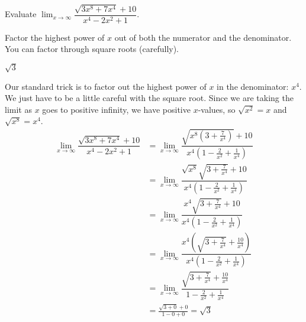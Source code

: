 \begin{Mquestion}
Evaluate $\displaystyle\lim_{x \rightarrow\infty} \dfrac{\sqrt{3x^8+7x^4}+10}{x^4-2x^2+1}$.
\end{Mquestion}
\begin{hint} Factor the highest power of $x$ out of both the numerator
        and the denominator. You can factor through square roots (carefully).
 \end{hint}
\begin{answer} $\sqrt{3}$
\end{answer}
\begin{solution}
Our standard trick is to factor out the highest power of $x$ in the denominator: $x^4$. We just have to be a little careful with the square root. Since we are taking the limit as $x$ goes to positive infinity, we have positive $x$-values, so $\sqrt{x^2}=x$ and $\sqrt{x^8}=x^4$.
\begin{align*}
\displaystyle\lim_{x \rightarrow\infty} \dfrac{\sqrt{3x^8+7x^4}+10}{x^4-2x^2+1}&=
\displaystyle\lim_{x \rightarrow\infty} \dfrac{\sqrt{x^8(3+\frac{7}{x^4})}+10}{x^4(1-\frac{2}{x^2}+\frac{1}{x^4})}
\\&=
\displaystyle\lim_{x \rightarrow\infty} \dfrac{\sqrt{x^8}\sqrt{3+\frac{7}{x^4}}+10}{x^4(1-\frac{2}{x^2}+\frac{1}{x^4})}\\&=
\displaystyle\lim_{x \rightarrow\infty} \dfrac{x^4\sqrt{3+\frac{7}{x^4}}+10}{x^4(1-\frac{2}{x^2}+\frac{1}{x^4})}\\&=
\displaystyle\lim_{x \rightarrow\infty} \dfrac{x^4\left(\sqrt{3+\frac{7}{x^4}}+\frac{10}{x^4}\right)}{x^4(1-\frac{2}{x^2}+\frac{1}{x^4})}\\&=
\displaystyle\lim_{x \rightarrow\infty} \dfrac{\sqrt{3+\frac{7}{x^4}}+\frac{10}{x^4}}{1-\frac{2}{x^2}+\frac{1}{x^4}}\\
&=\frac{\sqrt{3+0}+0}{1-0+0}=\sqrt{3}
\end{align*}
\end{solution}


